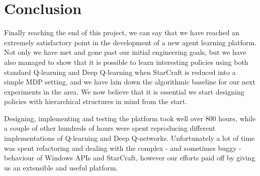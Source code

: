 
\chapter{Conclusion}

Finally reaching the end of this project, we can say that we have reached an
extremely satisfactory point in the development of a new agent learning
platform. Not only we have met and gone past our initial engineering goals, but
we have also managed to show that it is possible to learn interesting policies
using both standard Q-learning and Deep Q-learning when StarCraft is reduced
into a simple MDP setting, and we have lain down the algorithmic baseline for
our next experiments in the area. We now believe that it is essential we start
designing policies with hierarchical structures in mind from the start.

Designing, implementing and testing the platform took well over 800 hours, while
a couple of other hundreds of hours were spent reproducing different
implementations of Q-learning and Deep Q-networks. Unfortunately a lot of time
was spent refactoring and dealing with the complex - and sometimes buggy -
behaviour of Windows APIs and StarCraft, however our efforts paid off by giving
us an extensible and useful platform.
